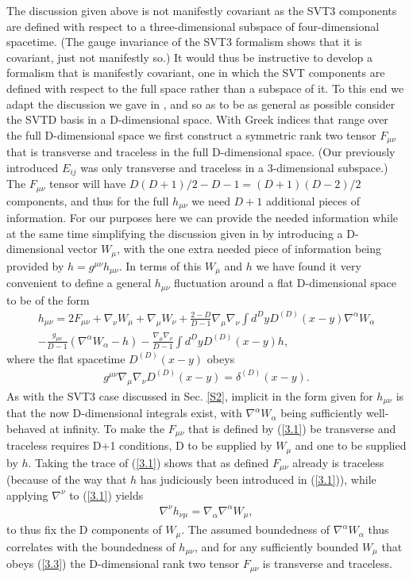 The discussion given above is not manifestly covariant as the SVT3 components are defined with respect to a three-dimensional subspace of four-dimensional spacetime. (The gauge invariance of the SVT3 formalism shows that it is covariant, just not manifestly so.) It would thus be instructive to develop a formalism that is manifestly covariant, one in which the SVT components are defined with respect to the full space rather than a subspace of it. To this end we adapt the discussion we gave in \cite{amarasinghe_2019}, and so as to be as general as possible consider the SVTD basis in a D-dimensional space.  With Greek indices that range over the full D-dimensional space we first construct a symmetric rank two tensor $F_{\mu\nu}$  that is transverse and traceless in the full D-dimensional space. (Our previously introduced $E_{ij}$ was only transverse and traceless in a 3-dimensional subspace.) The $F_{\mu\nu}$ tensor will have $D(D+1)/2-D-1=(D+1)(D-2)/2$ components, and thus for the full $h_{\mu\nu}$ we need $D+1$ additional pieces of information. For our purposes here we can provide the needed information while at the same time simplifying the discussion given in \cite{amarasinghe_2019} by introducing a D-dimensional  vector $W_{\mu}$, with the one extra needed piece of information being provided by $h=g^{\mu\nu}h_{\mu\nu}$. In terms of this $W_{\mu}$ and $h$ we have found it very convenient to define a general $h_{\mu\nu}$ fluctuation around a flat D-dimensional space to be of the form
%
\begin{eqnarray}
h_{\mu\nu}=2F_{\mu\nu}+\nabla_{\nu}W_{\mu}+\nabla_{\mu}W_{\nu}+\frac{2-D}{D-1}\nabla_{\mu}\nabla_{\nu}\int d^DyD^{(D)}(x-y)\nabla^{\alpha}W_{\alpha}
\nonumber\\
-\frac{g_{\mu\nu}}{D-1}(\nabla^{\alpha}W_{\alpha}-h)-\frac{\nabla_{\mu}\nabla_{\nu}}{D-1}\int d^DyD^{(D)}(x-y)h,
\label{3.1}
\end{eqnarray}
%
where the flat spacetime $D^{(D)}(x-y)$ obeys 
%
\begin{eqnarray}
g^{\mu\nu}\nabla_{\mu}\nabla_{\nu}D^{(D)}(x-y)=\delta^{(D)}(x-y).
\label{3.2}
\end{eqnarray}
%
As with the SVT3 case discussed in Sec. \ref{S2}, implicit in the form given for $h_{\mu\nu}$  is that the now D-dimensional integrals exist, with $\nabla^{\alpha}W_{\alpha}$ being sufficiently well-behaved at infinity.
To make the $F_{\mu\nu}$ that is defined by (\ref{3.1}) be transverse and traceless requires D+1 conditions, D to be supplied by $W_{\mu}$ and one  to be supplied by $h$. Taking the trace of (\ref{3.1}) shows that as defined $F_{\mu\nu}$ already is traceless (because of the way that $h$ has judiciously been introduced in (\ref{3.1})), while applying $\nabla^{\nu}$  to (\ref{3.1}) yields
%
\begin{eqnarray}
\nabla^{\nu}h_{\nu\mu}=\nabla_{\alpha}\nabla^{\alpha}W_{\mu},
\label{3.3}
\end{eqnarray}
% 
to thus fix the D components of $W_{\mu}$. The assumed boundedness of $\nabla^{\alpha}W_{\alpha}$ thus correlates with the boundedness of $h_{\mu\nu}$, and  for any sufficiently bounded $W_{\mu}$ that obeys (\ref{3.3}) the D-dimensional rank two tensor $F_{\mu\nu}$ is transverse and traceless.

